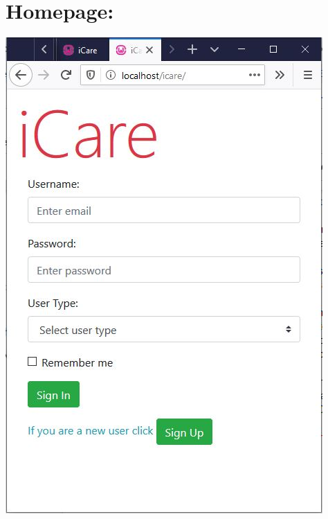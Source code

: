 \documentclass[a4paper,12pt]{report}
\begin{document}
\section*{Homepage:}
\includegraphics[scale=0.8]{Implementation/homepage.JPG}
\end{document}
